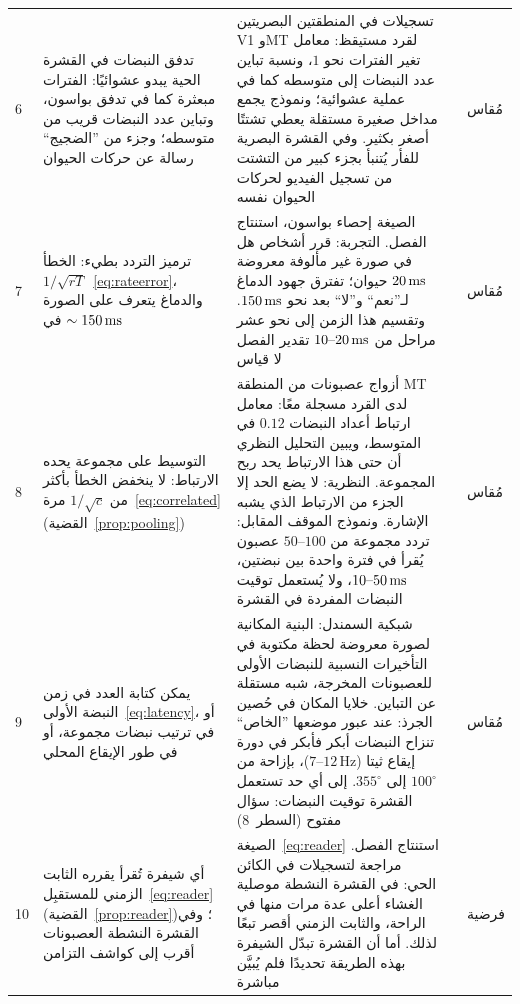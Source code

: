{\begin{longtable}{>{\raggedright}p{0.5cm}>{\raggedright}p{4.0cm}>{\raggedright}p{5.6cm}>{\raggedright}p{2.3cm}>{\raggedright\arraybackslash}p{1.7cm}}
6 & تدفق النبضات في القشرة الحية يبدو عشوائيًا: الفترات مبعثرة كما في تدفق بواسون، وتباين عدد النبضات قريب من متوسطه؛ وجزء من ”الضجيج“ رسالة عن حركات الحيوان & تسجيلات في المنطقتين البصريتين \foreignlanguage{english}{V1} و\foreignlanguage{english}{MT} لقرد مستيقظ: معامل تغير الفترات نحو $1$، ونسبة تباين عدد النبضات إلى متوسطه كما في عملية عشوائية؛ ونموذج يجمع مداخل صغيرة مستقلة يعطي تشتتًا أصغر بكثير. وفي القشرة البصرية للفأر يُتنبأ بجزء كبير من التشتت من تسجيل الفيديو لحركات الحيوان نفسه & \cite{Softky1993,Stringer2019} & مُقاس \\
7 & ترميز التردد بطيء: الخطأ $1/\sqrt{rT}$~\eqref{eq:rateerror}، والدماغ يتعرف على الصورة في $\sim150\,\text{ms}$ & الصيغة إحصاء بواسون، استنتاج الفصل. التجربة: قرر أشخاص هل في صورة غير مألوفة معروضة $20\,\text{ms}$ حيوان؛ تفترق جهود الدماغ لـ”نعم“ و”لا“ بعد نحو $150\,\text{ms}$. وتقسيم هذا الزمن إلى نحو عشر مراحل من $10\text{--}20\,\text{ms}$ تقدير الفصل لا قياس & \cite{Thorpe1996} & مُقاس \\
8 & التوسيط على مجموعة يحده الارتباط: لا ينخفض الخطأ بأكثر من $1/\sqrt c$ مرة~\eqref{eq:correlated} (القضية~\ref{prop:pooling}) & أزواج عصبونات من المنطقة \foreignlanguage{english}{MT} لدى القرد مسجلة معًا: معامل ارتباط أعداد النبضات $0.12$ في المتوسط، ويبين التحليل النظري أن حتى هذا الارتباط يحد ربح المجموعة. النظرية: لا يضع الحد إلا الجزء من الارتباط الذي يشبه الإشارة. ونموذج الموقف المقابل: تردد مجموعة من $50\text{--}100$ عصبون يُقرأ في فترة واحدة بين نبضتين، $10\text{--}50\,\text{ms}$، ولا يُستعمل توقيت النبضات المفردة في القشرة & \cite{Zohary1994,MorenoBote2014,ShadlenNewsome1998} & مُقاس \\
9 & يمكن كتابة العدد في زمن النبضة الأولى~\eqref{eq:latency}، أو في ترتيب نبضات مجموعة، أو في طور الإيقاع المحلي & شبكية السمندل: البنية المكانية لصورة معروضة لحظة مكتوبة في التأخيرات النسبية للنبضات الأولى للعصبونات المخرجة، شبه مستقلة عن التباين. خلايا المكان في حُصين الجرذ: عند عبور موضعها ”الخاص“ تنزاح النبضات أبكر فأبكر في دورة إيقاع ثيتا ($7\text{--}12\,\text{Hz}$)، بإزاحة من $100^\circ$ إلى $355^\circ$. إلى أي حد تستعمل القشرة توقيت النبضات: سؤال مفتوح (السطر~8) & \cite{Gollisch2008,OKeefe1993} & مُقاس \\
10 & أي شيفرة تُقرأ يقرره الثابت الزمني للمستقبِل~\eqref{eq:reader} (القضية~\ref{prop:reader})؛ وفي القشرة النشطة العصبونات أقرب إلى كواشف التزامن & الصيغة~\eqref{eq:reader} استنتاج الفصل. مراجعة لتسجيلات في الكائن الحي: في القشرة النشطة موصلية الغشاء أعلى عدة مرات منها في الراحة، والثابت الزمني أقصر تبعًا لذلك. أما أن القشرة تبدّل الشيفرة بهذه الطريقة تحديدًا فلم يُبيَّن مباشرة & \cite{Destexhe2003} & فرضية \\

\end{longtable}}
